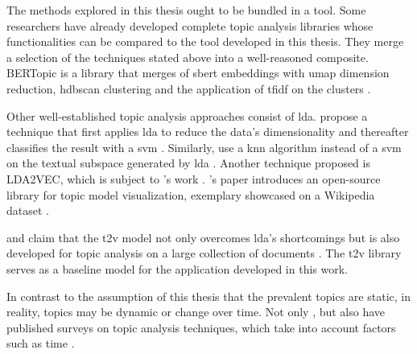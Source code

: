 The methods explored in this thesis ought to be bundled in a tool.
Some researchers have already developed complete topic analysis libraries whose functionalities can be compared to the tool developed in this thesis.
They merge a selection of the techniques stated above into a well-reasoned composite.
BERTopic is a library that merges of \ac{sbert} embeddings with \ac{umap} dimension reduction, 
\ac{hdbscan} clustering and the application of \ac{tfidf} on the clusters \cite{bertopic2022}.

Other well-established topic analysis approaches consist of \ac{lda}.
\citeauthor{lda2008} propose a technique that first applies \ac{lda} to reduce the data's dimensionality 
and thereafter classifies the result with a \ac{svm} \cite{lda2008}.
Similarly, \citeauthor{LDA2016} use a \ac{knn} algorithm instead of a \ac{svm} on the textual subspace generated by \ac{lda} \cite{LDA2016}.
Another technique proposed is LDA2VEC, which is subject to \citeauthor{evolution_of_topic_modeling2022}'s work \cite{evolution_of_topic_modeling2022}.
\citeauthor{topic_modeling2021}'s paper introduces an open-source library for topic model visualization, 
exemplary showcased on a Wikipedia dataset \cite{topic_modeling2021}.

\citeauthor{Top2Vec2020} and \citeauthor{Topic2Vec2015} claim that the \ac{t2v} model not only overcomes \ac{lda}'s shortcomings \cite{Top2Vec2020, Topic2Vec2015}
but is also developed for topic analysis on a large collection of documents \cite{Top2Vec2020}.
The \ac{t2v} library serves as a baseline model for the application developed in this work.

In contrast to the assumption of this thesis that the prevalent topics are static, in reality, topics may be dynamic or change over time.
Not only \citeauthor{topic_modeling2015}, but also \citeauthor{topic_modeling2020} have published surveys on topic analysis techniques, 
which take into account factors such as time \cite{topic_modeling2015, topic_modeling2020}.

